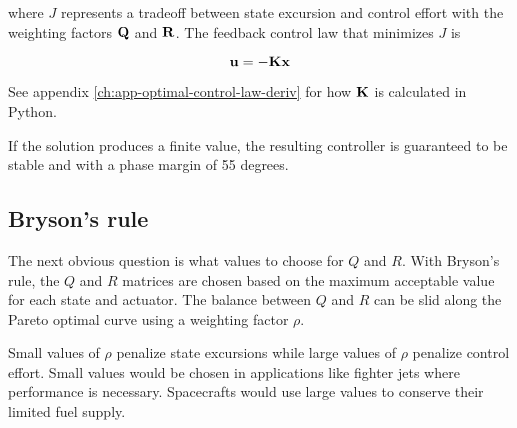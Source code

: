 where $J$ represents a tradeoff between \gls{state} excursion and control effort
with the weighting factors $\mathbf{Q}$ and $\mathbf{R}$. The feedback
\gls{control law} that minimizes $J$ is

\begin{equation*}
  \mathbf{u} = -\mathbf{K}\mathbf{x}
\end{equation*}

See appendix \ref{ch:app-optimal-control-law-deriv} for how $\mathbf{K}$ is
calculated in Python.

If the solution produces a finite value, the resulting controller is guaranteed
to be stable and  with a \gls{phase margin} of 55
degrees.

\subsection{Bryson's rule}

The next obvious question is what values to choose for $Q$ and $R$. With
Bryson's rule, the $Q$ and $R$ matrices are chosen based on the maximum
acceptable value for each \gls{state} and actuator. The balance between $Q$ and
$R$ can be slid along the Pareto optimal curve using a weighting factor $\rho$.

Small values of $\rho$ penalize \gls{state} excursions while large values of
$\rho$ penalize control effort. Small values would be chosen in applications
like fighter jets where performance is necessary. Spacecrafts would use large
values to conserve their limited fuel supply.
